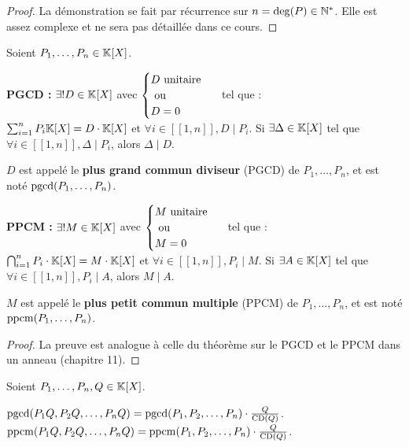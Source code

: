 \documentclass[12pt,a4paper]{report}
\begin{document}
\begin{proof}
    La démonstration se fait par récurrence sur $n = \deg(P) \in \mathbb{N}^*$. Elle est assez complexe et ne sera pas détaillée dans ce cours.
\end{proof}

\begin{theorem}
    Soient $P_1,\dots,P_n \in \mathbb{K}[X]$.
    \begin{outline}[enumerate]
        \1 \textbf{PGCD :}
        \2 $\exists ! D \in \mathbb{K}[X]$ avec $\begin{cases}D \text{ unitaire }\\\text{ ou }\\D= 0\end{cases}$ tel que :\\ $\sum_{i=1}^{n}P_i \mathbb{K}[X] = D\cdot\mathbb{K}[X]$ et $\forall i \in [\![1,n]\!], D \mid P_i$.
        \2 Si $\exists \Delta \in \mathbb{K}[X]$ tel que $\forall i \in [\![1,n]\!], \Delta \mid P_i$, alors $\Delta \mid D$.
        
        $D$ est appelé le \textbf{plus grand commun diviseur} (PGCD) de $P_1,\dots,P_n$, et est noté $\mathrm{pgcd}(P_1,\dots,P_n)$.

        \1 \textbf{PPCM :}
        \2 $\exists ! M \in \mathbb{K}[X]$ avec $\begin{cases}M \text{ unitaire }\\\text{ ou }\\M= 0\end{cases}$ tel que :\\ $\bigcap_{i=1}^{n} P_i \cdot \mathbb{K}[X] = M\cdot\mathbb{K}[X]$ et $\forall i \in [\![1,n]\!], P_i \mid M$.
        \2 Si $\exists A \in \mathbb{K}[X]$ tel que $\forall i \in [\![1,n]\!], P_i \mid A$, alors $M \mid A$.

        $M$ est appelé le \textbf{plus petit commun multiple} (PPCM) de $P_1,\dots,P_n$, et est noté $\mathrm{ppcm}(P_1,\dots,P_n)$.
    \end{outline}
\end{theorem}

\begin{proof}
    La preuve est analogue à celle du théorème sur le PGCD et le PPCM dans un anneau (chapitre 11).
\end{proof}

\begin{property}
    Soient $P_1, \dots , P_n, Q \in \mathbb{K}[X]$.
    \begin{outline}[enumerate]
        \1 $\mathrm{pgcd}(P_1Q, P_2Q, \dots, P_nQ) = \mathrm{pgcd}(P_1, P_2, \dots, P_n) \cdot \frac{Q}{\mathrm{CD}(Q)}$.
        \1 $\mathrm{ppcm}(P_1Q, P_2Q, \dots, P_nQ) = \mathrm{ppcm}(P_1, P_2, \dots, P_n) \cdot \frac{Q}{\mathrm{CD}(Q)}$.
    \end{outline}
\end{property}
\end{document}
